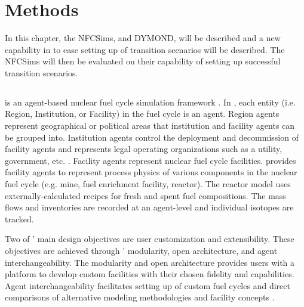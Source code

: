 \chapter{Methods}
\label{chap:3}
In this chapter, the \glspl{NFCSim}, \Cyclus and DYMOND, will 
be described and a new capability in \Cyclus to ease setting up 
of transition scenarios will be described. 
The \glspl{NFCSim} will then be evaluated on their capability of 
setting up successful transition scenarios. 

\section{\Cyclus}
\Cyclus is an agent-based nuclear fuel cycle simulation framework 
\cite{huff_fundamental_2016}. 
In \Cyclus, each entity (i.e. Region, Institution, or Facility) in the 
fuel cycle is an agent. 
Region agents represent geographical or political areas that institution
and facility agents can be grouped into. 
Institution agents control the 
deployment and decommission of facility agents 
and represents legal operating organizations such as a 
utility, government, etc. \cite{huff_fundamental_2016}. 
Facility agents represent nuclear fuel cycle facilities. 
\Cycamore \cite{carlsen_cycamore_2014}
provides facility agents to represent process physics of various 
components in the nuclear fuel cycle (e.g. mine, fuel enrichment 
facility, reactor). 
The \Cycamore reactor model uses externally-calculated 
recipes for fresh and spent fuel compositions. 
The mass flows and inventories are recorded at an agent-level
and individual isotopes are tracked. 

Two of \Cyclus' main design objectives are user customization and 
extensibility. 
These objectives are achieved through \Cyclus' modularity, 
open architecture, and agent interchangeability. 
The modularity and open architecture provides users with a 
platform to develop custom facilities with their chosen fidelity 
and capabilities. 
Agent interchangeability facilitates setting up of custom fuel 
cycles and direct comparisons of alternative modeling methodologies 
and facility concepts \cite{huff_fundamental_2016}. 


